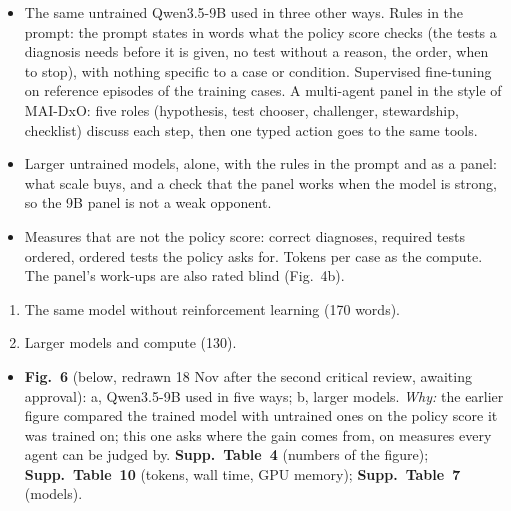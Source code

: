 \content
\begin{itemize}
\item The same untrained Qwen3.5-9B used in three other ways. Rules in the prompt: the prompt states
in words what the policy score checks (the tests a diagnosis needs before it is given, no test
without a reason, the order, when to stop), with nothing specific to a case or condition. Supervised
fine-tuning on reference episodes of the training cases. A multi-agent panel in the style of MAI-DxO:
five roles (hypothesis, test chooser, challenger, stewardship, checklist) discuss each step, then one
typed action goes to the same tools.
\item Larger untrained models, alone, with the rules in the prompt and as a panel: what scale buys,
and a check that the panel works when the model is strong, so the 9B panel is not a weak opponent.
\item Measures that are not the policy score: correct diagnoses, required tests ordered, ordered tests
the policy asks for. Tokens per case as the compute. The panel's work-ups are also rated blind
(Fig.~4b).
\end{itemize}

\structure
\begin{enumerate}
\item The same model without reinforcement learning (170 words).
\item Larger models and compute (130).
\end{enumerate}

\artefacts
\begin{itemize}
\item \textbf{Fig.~6} (below, redrawn 18 Nov after the second critical review, awaiting approval): a,
Qwen3.5-9B used in five ways; b, larger models. \emph{Why:} the earlier figure compared the trained
model with untrained ones on the policy score it was trained on; this one asks where the gain comes
from, on measures every agent can be judged by. \textbf{Supp.\ Table~4} (numbers of the figure);
\textbf{Supp.\ Table~10} (tokens, wall time, GPU memory); \textbf{Supp.\ Table~7} (models).
\end{itemize}


